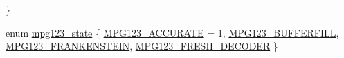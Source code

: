 \begin{DoxyCompactItemize}
 \}
\item 
enum \mbox{\hyperlink{group__mpg123__status_gadfc90f3072f8c1fe32dd88854f6afb28}{mpg123\+\_\+state}} \{ \mbox{\hyperlink{group__mpg123__status_ggadfc90f3072f8c1fe32dd88854f6afb28a3b60be4690824a19084f134254019dfb}{M\+P\+G123\+\_\+\+A\+C\+C\+U\+R\+A\+TE}} = 1, 
\mbox{\hyperlink{group__mpg123__status_ggadfc90f3072f8c1fe32dd88854f6afb28a54c2be407f25a8261af7121081be11c2}{M\+P\+G123\+\_\+\+B\+U\+F\+F\+E\+R\+F\+I\+LL}}, 
\mbox{\hyperlink{group__mpg123__status_ggadfc90f3072f8c1fe32dd88854f6afb28ab0699a32eb0eea669e8175f1f8554209}{M\+P\+G123\+\_\+\+F\+R\+A\+N\+K\+E\+N\+S\+T\+E\+IN}}, 
\mbox{\hyperlink{group__mpg123__status_ggadfc90f3072f8c1fe32dd88854f6afb28af79c0a2d6cc022956d13d9710c1527e3}{M\+P\+G123\+\_\+\+F\+R\+E\+S\+H\+\_\+\+D\+E\+C\+O\+D\+ER}}
 \}
\end{DoxyCompactItemize}
